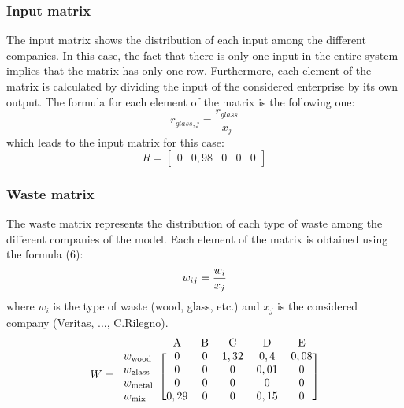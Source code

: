  \subsubsection{Input matrix}
 The input matrix shows the distribution of each input among the different companies. In this case, the fact that there is only one input in the entire system implies that the matrix has only one row. Furthermore, each element of the matrix is calculated by dividing the input of the considered enterprise by its own output. The formula for each element of the matrix is the following one: 
 \begin{equation}
     r_{glass,j}=\frac{r_{glass}}{x_j}
 \end{equation}
 which leads to the input matrix for this case: 
 \begin{equation}
     R=
     \begin{bmatrix}
         0 & 0,98 & 0 & 0 & 0
     \end{bmatrix}
 \end{equation}
 
 \subsubsection{Waste matrix}
  The waste matrix represents the distribution of each type of waste among the different companies of the model. Each element of the matrix is obtained using the formula (6):
 \begin{equation}
     w_{ij}=\frac{w_i}{x_j} \\
 \end{equation}
 where $w_i$ is the type of waste (wood, glass, etc.) and $x_j$ is the considered company (Veritas, ..., C.Rilegno).
\begin{equation}
    \label{eq:matrice_rifiuti}
    W = 
        \begin{blockarray}{cccccc}
         & \text{A} & \text{B} & \text{C} & \text{D} & \text{E} \\
        \begin{block}{l[ccccc]}
    w_{\text{wood}}  & 0    & 0 & 1,32 & 0,4  & 0,08 \\
    w_{\text{glass}} & 0    & 0 & 0    & 0,01 & 0    \\
    w_{\text{metal}} & 0    & 0 & 0    & 0    & 0    \\
    w_{\text{mix}}   & 0,29 & 0 & 0    & 0,15 & 0    \\
         \end{block}
         \end{blockarray}
\end{equation}

